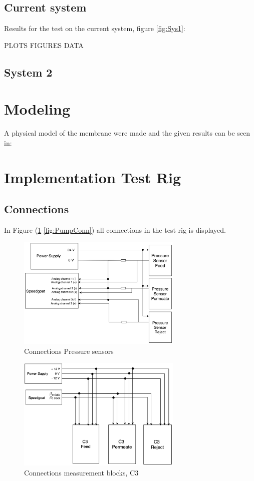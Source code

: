 \subsection{Current system}
Results for the test on the current system, figure \ref{fig:Sys1}:

PLOTS FIGURES DATA

\subsection{System 2}


\section{Modeling}
A physical model of the membrane were made and the given results can be seen in: 

\section{Implementation Test Rig}


\subsection{Connections}
In Figure (\ref{fig:PressConn}-\ref{fig:PumpConn}) all connections in the test rig is displayed.


\begin{figure}[h]
    \centering
    \includegraphics[width=0.7\textwidth]{PressConn}
    \caption{Connections Pressure sensors}
    \label{fig:PressConn}
\end{figure}

\begin{figure}[h]
    \centering
    \includegraphics[width=0.7\textwidth]{C3Conn}
    \caption{Connections measurement blocks, C3}
    \label{fig:C3Conn}
\end{figure}

